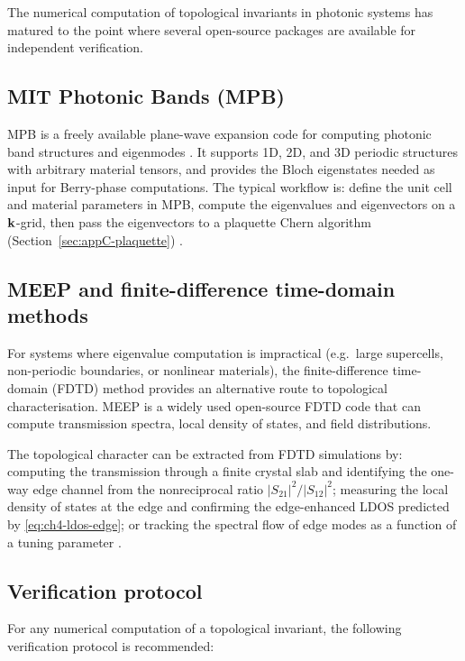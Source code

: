 The numerical computation of topological invariants in photonic
systems has matured to the point where several open-source packages
are available for independent verification.

\subsection{MIT Photonic Bands (MPB)}
\label{sec:appC-mpb}

MPB is a freely available plane-wave expansion code for computing
photonic band structures and eigenmodes \cite{johnson2026block}.  It supports 1D, 2D, and
3D periodic structures with arbitrary material tensors, and provides
the Bloch eigenstates needed as input for Berry-phase computations.
The typical workflow is: define the unit cell and material parameters
in MPB, compute the eigenvalues and eigenvectors on a $\mathbf{k}$-grid,
then pass the eigenvectors to a plaquette Chern algorithm
(Section~\ref{sec:appC-plaquette})
\cite{ozawa2018topological}.

\subsection{MEEP and finite-difference time-domain methods}
\label{sec:appC-meep}

For systems where eigenvalue computation is impractical (e.g.\ large
supercells, non-periodic boundaries, or nonlinear materials), the
finite-difference time-domain (FDTD) method provides an alternative
route to topological characterisation.  MEEP is a widely used
open-source FDTD code that can compute transmission spectra, local
density of states, and field distributions.

The topological character can be extracted from FDTD simulations by:
computing the transmission through a finite crystal slab and
identifying the one-way edge channel from the nonreciprocal ratio
$|S_{21}|^2/|S_{12}|^2$; measuring the local density of states at
the edge and confirming the edge-enhanced LDOS predicted by
\eqref{eq:ch4-ldos-edge}; or tracking the spectral flow of edge
modes as a function of a tuning parameter
\cite{price2022roadmap,ozawa2018topological}.

\subsection{Verification protocol}
\label{sec:appC-verification}

For any numerical computation of a topological invariant, the
following verification protocol is recommended:

